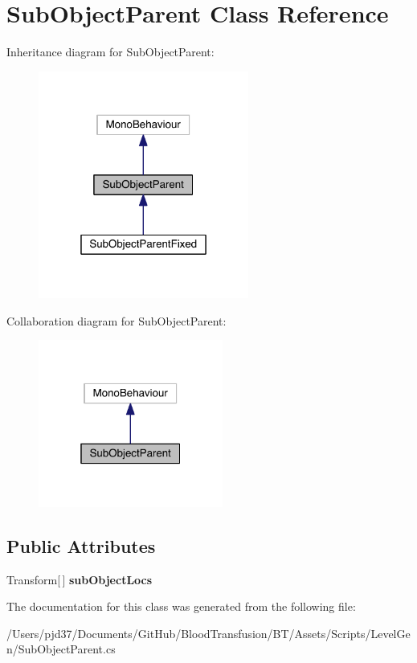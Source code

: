 \hypertarget{class_sub_object_parent}{}\section{Sub\+Object\+Parent Class Reference}
\label{class_sub_object_parent}


Inheritance diagram for Sub\+Object\+Parent\+:\nopagebreak
\begin{figure}[H]
\begin{center}
\leavevmode
\includegraphics[width=196pt]{class_sub_object_parent__inherit__graph}
\end{center}
\end{figure}


Collaboration diagram for Sub\+Object\+Parent\+:\nopagebreak
\begin{figure}[H]
\begin{center}
\leavevmode
\includegraphics[width=172pt]{class_sub_object_parent__coll__graph}
\end{center}
\end{figure}
\subsection*{Public Attributes}
\begin{DoxyCompactItemize}
\item 
Transform\mbox{[}$\,$\mbox{]} {\bfseries sub\+Object\+Locs}\hypertarget{class_sub_object_parent_aa91595ecae35c8939d6b4fcf5949efce}{}\label{class_sub_object_parent_aa91595ecae35c8939d6b4fcf5949efce}

\end{DoxyCompactItemize}


The documentation for this class was generated from the following file\+:\begin{DoxyCompactItemize}
\item 
/\+Users/pjd37/\+Documents/\+Git\+Hub/\+Blood\+Transfusion/\+B\+T/\+Assets/\+Scripts/\+Level\+Gen/Sub\+Object\+Parent.\+cs\end{DoxyCompactItemize}
